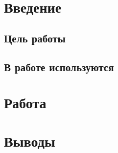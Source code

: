 \documentclass{article}
\author{Александр Романов Б01-110}
\date{}
\title{}
\begin{document}
\maketitle
\section{Введение}
\subsection{Цель работы}

\subsection{В работе используются}
\section{Работа}
\section{Выводы}
\end{document}
